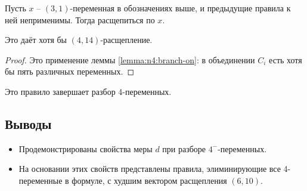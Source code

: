 \begin{brule}
 Пусть $x$ -- $(3,1)$-переменная в обозначениях выше, и предыдущие правила к ней неприменимы.
 Тогда расщепиться по $x$.

 Это даёт хотя бы $(4,14)$-расщепление.
 \label{brule:n4:31:final}
\end{brule}

\begin{proof}
 Это применение леммы \ref{lemma:n4:branch-on}: в объединении $C_i$ есть хотя бы пять различных переменных.
\end{proof}

Это правило завершает разбор 4-переменных.

\subsection{Выводы}
\label{subsec:n4:summary}

\begin{itemize}
 \item Продемонстрированы свойства меры $d$ при разборе $4^-$-переменных.
 \item На основании этих свойств представлены правила, элиминирующие все 4-переменные в формуле, с худшим вектором расщепления $(6,10)$.
\end{itemize}


